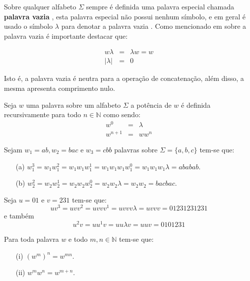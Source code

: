 Sobre qualquer alfabeto $\Sigma$ sempre é definida uma palavra especial chamada \textbf{palavra vazia} \cite{hopcroft2008, linz2006}, esta palavra especial não possui nenhum símbolo, e em geral é usado o símbolo $\lambda$ para denotar a palavra vazia \cite{benjaLivro2010, valdi2016master}. Como mencionado em \cite{benjaLivro2010, valdi2020phd} sobre a palavra vazia é importante destacar que:

\begin{eqnarray}
	w\lambda & = & \lambda w = w\\
	|\lambda| & = &  0
\end{eqnarray}

Isto é, a palavra vazia é neutra para a operação de concatenação, além disso, a mesma apresenta comprimento nulo.

\begin{definition}\label{def:PotenciaPalavras}
	Seja $w$ uma palavra sobre um alfabeto $\Sigma$ a potência de $w$ é definida recursivamente para todo $n \in \mathbb{N}$ como sendo:
	\begin{eqnarray}
		w^0 & = & \lambda\\
		w^{n+1} & = & ww^{n}
	\end{eqnarray}
\end{definition}

\begin{exem}
	Sejam $w_1 = ab, w_2 = bac$ e $w_3 = cbb$ palavras sobre $\Sigma = \{a, b, c\}$ tem-se que:
	\begin{itemize}
		\item[(a)] $w_1^3 = w_1w_1^2 = w_1w_1w_1^1 = w_1w_1w_1w_1^0 = w_1w_1w_1\lambda = ababab$.
		\item[(b)] $w_2^2 = w_2w_2^1 = w_2w_2w_2^0 = w_2w_2\lambda = w_2w_2 = bacbac$.
	\end{itemize} 
\end{exem}

\begin{exem}
	Seja $u = 01$ e $v = 231$ tem-se que: 
	$$uv^3 = uvv^2 = uvvv^1 = uvvv\lambda = uvvv = 01231231231$$
	e também 
	$$u^2v = uu^1v = uu\lambda v = uuv = 0101231$$
\end{exem}

\begin{prop}
	Para toda palavra $w$ e todo $m,n \in \mathbb{N}$ tem-se que:
	\begin{itemize}
		\item[(i)] $(w^m)^n = w^{mn}$.
		\item[(ii)] $w^mw^n = w^{m+n}$.
	\end{itemize}
\end{prop}

